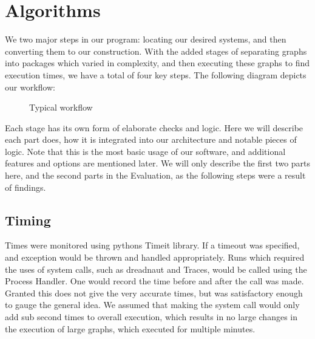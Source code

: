 \section{Algorithms}
We two major steps in our program: locating our desired systems, and then converting them to our construction. With the added stages of separating graphs into packages which varied in complexity, and then executing these graphs to find execution times, we have a total of four key steps. The following diagram depicts our workflow:

\begin{figure}[h]
	\centering
	\caption{Typical workflow}
	
	
\end{figure}
Each stage has its own form of elaborate checks and logic. Here we will describe each part does, how it is integrated into our architecture and notable pieces of logic. Note that this is the most basic usage of our software, and additional features and options are mentioned later. We will only describe the first two parts here, and the second parts in the Evaluation, as the following steps were a result of findings. 

\subsection{Timing}
Times were monitored using pythons Timeit library. If a timeout was specified, and exception would be thrown and handled appropriately. Runs which required the uses of system calls, such as dreadnaut and Traces, would be called using the Process Handler. One would record the time before and after the call was made. Granted this does not give the very accurate times, but was satisfactory enough to gauge the general idea. We assumed that making the system call would only add sub second times to overall execution, which results in no large changes in the execution of large graphs, which executed for multiple minutes. 
\newpage

